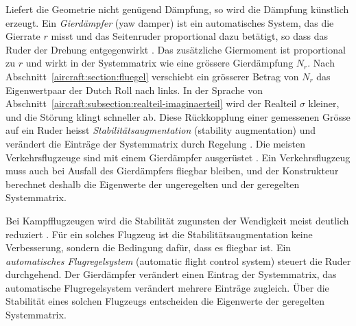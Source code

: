 Liefert die Geometrie nicht genügend Dämpfung, so wird die Dämpfung künstlich
erzeugt.
Ein \emph{Gierdämpfer} (yaw damper) ist ein automatisches System, das die
%
Gierrate $r$ misst und das Seitenruder proportional dazu betätigt, so dass
das Ruder der Drehung entgegenwirkt \cite{aircraft:nelson}.
Das zusätzliche Giermoment ist proportional zu $r$ und wirkt in der
Systemmatrix wie eine grössere Gierdämpfung $N_r$.
Nach Abschnitt~\ref{aircraft:section:fluegel} verschiebt ein grösserer Betrag
von $N_r$ das Eigenwertpaar der Dutch Roll nach links.
In der Sprache von Abschnitt~\ref{aircraft:subsection:realteil-imaginaerteil}
wird der Realteil $\sigma$ kleiner, und die Störung klingt schneller ab.
Diese Rückkopplung einer gemessenen Grösse auf ein Ruder heisst
\emph{Stabilitätsaugmentation} (stability augmentation) und verändert die
%
%
Einträge der Systemmatrix durch Regelung \cite{aircraft:nelson}.
Die meisten Verkehrsflugzeuge sind mit einem Gierdämpfer ausgerüstet
\cite{aircraft:nelson}.
Ein Verkehrsflugzeug muss auch bei Ausfall des Gierdämpfers fliegbar bleiben,
und der Konstrukteur berechnet deshalb die Eigenwerte der ungeregelten und der
geregelten Systemmatrix.

Bei Kampfflugzeugen wird die Stabilität zugunsten der Wendigkeit meist
deutlich reduziert \cite{aircraft:sadraey}.
Für ein solches Flugzeug ist die Stabilitätsaugmentation keine Verbesserung,
sondern die Bedingung dafür, dass es fliegbar ist.
Ein \emph{automatisches Flugregelsystem} (automatic flight control system)
%
%
steuert die Ruder durchgehend.
Der Gierdämpfer verändert einen Eintrag der Systemmatrix, das
automatische Flugregelsystem verändert mehrere Einträge zugleich.
Über die Stabilität eines solchen Flugzeugs entscheiden die Eigenwerte der
geregelten Systemmatrix.
